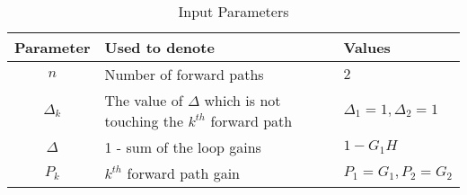 \begin{table}[ht]
\centering
\setlength{\extrarowheight}{8pt}
\caption{Input Parameters}
\begin{tabular}{|c|l|l|} 
\hline
\textbf{Parameter} & \textbf{Used to denote} & \textbf{Values} \\
\hline
$n$ & Number of forward paths & \multicolumn{1}{|p{1.3cm}|}{\centering $2$ }\\
\hline
$\Delta_k$ & The value of $\Delta$ which is not touching the $k^{th} $ forward path & \multicolumn{1}{|p{1.3cm}|}{\centering $\Delta_1 = 1 , \Delta_2 = 1$ } \\
\hline
$\Delta$ & 1 - sum of the loop gains & \multicolumn{1}{|p{1.3cm}|}{\centering $1-G_1H$ } \\
\hline
$P_k$ & $k^{th}$ forward path gain & \multicolumn{1}{|p{1.3cm}|}{\centering $P_1 = G_1 , P_2 = G_2$ } \\
\hline
\end{tabular}
 \vspace{4mm}
 \label{tab:table0}
\end{table}